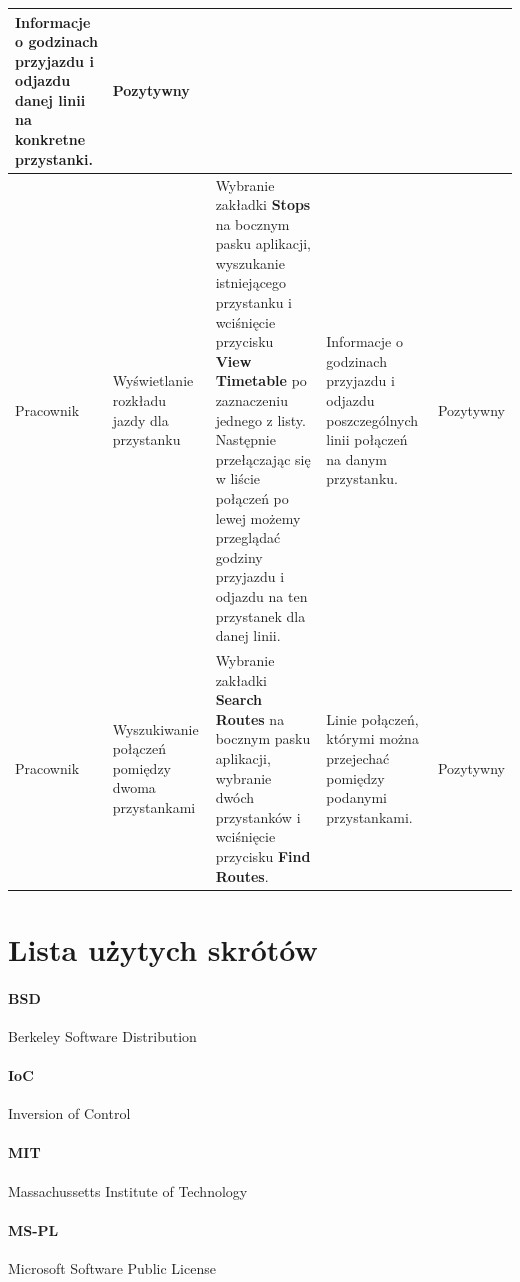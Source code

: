 \documentclass[10pt,a4paper]{article}
\begin{document}
\begin{tabularx}{\textwidth}{|X|X|X|X|l|}
	Informacje o godzinach przyjazdu i odjazdu danej linii na konkretne przystanki. &
	Pozytywny \\
	\hline
	Pracownik &
	Wyświetlanie rozkładu jazdy dla przystanku &
	Wybranie zakładki \textbf{Stops} na bocznym pasku aplikacji, wyszukanie istniejącego przystanku i wciśnięcie przycisku \textbf{View Timetable} po zaznaczeniu jednego z listy. Następnie przełączając się w liście połączeń po lewej możemy przeglądać godziny przyjazdu i odjazdu na ten przystanek dla danej linii. &
	Informacje o godzinach przyjazdu i odjazdu poszczególnych linii połączeń na danym przystanku. &
	Pozytywny \\
	\hline
	Pracownik &
	Wyszukiwanie połączeń pomiędzy dwoma przystankami &
	Wybranie zakładki \textbf{Search Routes} na bocznym pasku aplikacji, wybranie dwóch przystanków i wciśnięcie przycisku \textbf{Find Routes}. &
	Linie połączeń, którymi można przejechać pomiędzy podanymi przystankami. &
	Pozytywny \\
	\hline
\end{tabularx}

\newpage
\section{Lista użytych skrótów}
\label{abbr:bsd}
\paragraph{BSD} Berkeley Software Distribution

\label{abbr:ioc}
\paragraph{IoC} Inversion of Control

\label{abbr:mit}
\paragraph{MIT} Massachussetts Institute of Technology  

\label{abbr:mspl}
\paragraph{MS-PL} Microsoft Software Public License
\end{document}
